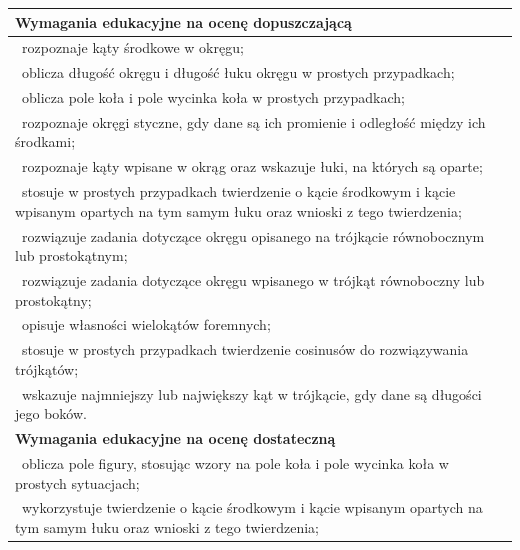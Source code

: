 \documentclass[12pt,a4paper]{article}
\begin{document}
	\begin{longtable}{|p{16cm}|}
		\hline
		
		\textbf{Wymagania edukacyjne na ocenę dopuszczającą} \\ \hline
		
		\textbullet\ rozpoznaje kąty środkowe w okręgu; \\
		
		\textbullet\ oblicza długość okręgu i długość łuku okręgu w prostych przypadkach; \\
		
		\textbullet\ oblicza pole koła i pole wycinka koła w prostych przypadkach; \\
		
		\textbullet\ rozpoznaje okręgi styczne, gdy dane są ich promienie i odległość między ich środkami; \\
		
		\textbullet\ rozpoznaje kąty wpisane w okrąg oraz wskazuje łuki, na których są oparte; \\
		
		\textbullet\ stosuje w prostych przypadkach twierdzenie o kącie środkowym i kącie wpisanym opartych na tym samym łuku oraz wnioski z tego twierdzenia; \\
		
		\textbullet\ rozwiązuje zadania dotyczące okręgu opisanego na trójkącie równobocznym lub prostokątnym; \\
		
		\textbullet\ rozwiązuje zadania dotyczące okręgu wpisanego w trójkąt równoboczny lub prostokątny; \\
		
		\textbullet\ opisuje własności wielokątów foremnych; \\
		
		\textbullet\ stosuje w prostych przypadkach twierdzenie cosinusów do rozwiązywania trójkątów; \\
		
		\textbullet\ wskazuje najmniejszy lub największy kąt w trójkącie, gdy dane są długości jego boków. \\ \hline
		
		\textbf{Wymagania edukacyjne na ocenę dostateczną} \\ \hline
		
		\textbullet\ oblicza pole figury, stosując wzory na pole koła i pole wycinka koła w prostych sytuacjach; \\
		
		\textbullet\ wykorzystuje twierdzenie o kącie środkowym i kącie wpisanym opartych na tym samym łuku oraz wnioski z tego twierdzenia; \\
		

\end{longtable}
\end{document}
